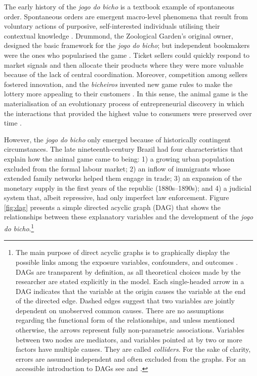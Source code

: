 The early history of the \emph{jogo do bicho} is a textbook example of spontaneous order. Spontaneous orders are emergent macro-level phenomena that result from voluntary actions of purposive, self-interested individuals utilising their contextual knowledge \citep{boettke1990theory, boettke2005methodological, hayek1945use, hayek1960constitution, hayek1973law, leeson2008coordination, menger1871grundsatze, polanyi1948planning, polanyi1951logic}. Drummond, the Zoological Garden's original owner, designed the basic framework for the \emph{jogo do bicho}; but independent bookmakers were the ones who popularised the game \citep[77]{magalhaes2005ganhou}. Ticket sellers could quickly respond to market signals and then allocate their products where they were more valuable because of the lack of central coordination. Moreover, competition among sellers fostered innovation, and the \emph{bicheiros} invented new game rules to make the lottery more appealing to their customers \citep[61]{mello1989historia}. In this sense, the animal game is the materialisation of an evolutionary process of entrepreneurial discovery in which the interactions that provided the highest value to consumers were preserved over time \citep{boettke2008gordon, boettke2014entrepreneurship, buchanan1964should, hayek1978competition, kirzner1997entrepreneurial}.

However, the \emph{jogo do bicho} only emerged because of historically contingent circumstances. The late nineteenth-century Brazil had four characteristics that explain how the animal game came to being: 1) a growing urban population excluded from the formal labour market; 2) an inflow of immigrants whose extended family networks helped them engage in trade; 3) an expansion of the monetary supply in the first years of the republic (1880s--1890s); and 4) a judicial system that, albeit repressive, had only imperfect law enforcement. Figure \ref{fig:dag} presents a simple directed acyclic graph (DAG) \citep{pearl2009causality} that shows the relationships between these explanatory variables and the development of the \emph{jogo do bicho}.\footnote{The main purpose of direct acyclic graphs is to graphically display the possible links among the exposure variables, confounders, and outcomes \citep{morgan2014counterfactuals, pearl2009causality}. DAGs are transparent by definition, as all theoretical choices made by the researcher are stated explicitly in the model. Each single-headed arrow in a DAG indicates that the variable at the origin causes the variable at the end of the directed edge. Dashed edges suggest that two variables are jointly dependent on unobserved common causes. There are no assumptions regarding the functional form of the relationships, and unless mentioned otherwise, the arrows represent fully non-parametric associations. Variables between two nodes are mediators, and variables pointed at by two or more factors have multiple causes. They are called \emph{colliders}. For the sake of clarity, errors are assumed independent and often excluded from the graphs. For an accessible introduction to DAGs see \citet[chap. 3--4]{morgan2014counterfactuals} and \citet{pearl2016causal}.}

